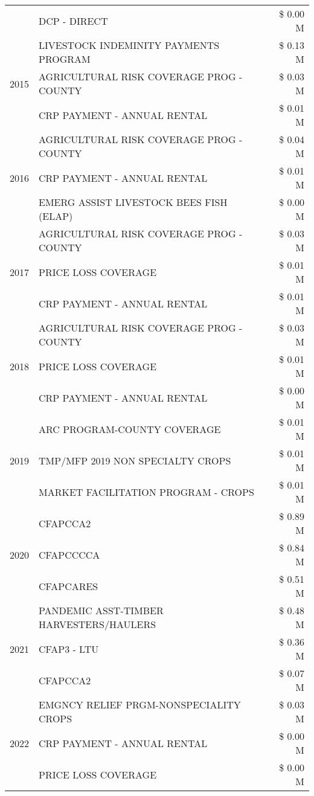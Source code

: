 \begin{tabular}{llr}
 & DCP - DIRECT & \$ 0.00 M \\
\cline{1-3}
\multirow[t]{3}{*}{2015} & LIVESTOCK INDEMINITY PAYMENTS PROGRAM & \$ 0.13 M \\
 & AGRICULTURAL RISK COVERAGE PROG - COUNTY & \$ 0.03 M \\
 & CRP PAYMENT - ANNUAL RENTAL & \$ 0.01 M \\
\cline{1-3}
\multirow[t]{3}{*}{2016} & AGRICULTURAL RISK COVERAGE PROG - COUNTY & \$ 0.04 M \\
 & CRP PAYMENT - ANNUAL RENTAL & \$ 0.01 M \\
 & EMERG ASSIST LIVESTOCK BEES FISH (ELAP) & \$ 0.00 M \\
\cline{1-3}
\multirow[t]{3}{*}{2017} & AGRICULTURAL RISK COVERAGE PROG - COUNTY & \$ 0.03 M \\
 & PRICE LOSS COVERAGE & \$ 0.01 M \\
 & CRP PAYMENT - ANNUAL RENTAL & \$ 0.01 M \\
\cline{1-3}
\multirow[t]{3}{*}{2018} & AGRICULTURAL RISK COVERAGE PROG - COUNTY & \$ 0.03 M \\
 & PRICE LOSS COVERAGE & \$ 0.01 M \\
 & CRP PAYMENT - ANNUAL RENTAL & \$ 0.00 M \\
\cline{1-3}
\multirow[t]{3}{*}{2019} & ARC PROGRAM-COUNTY COVERAGE & \$ 0.01 M \\
 & TMP/MFP 2019 NON SPECIALTY CROPS & \$ 0.01 M \\
 & MARKET FACILITATION PROGRAM - CROPS & \$ 0.01 M \\
\cline{1-3}
\multirow[t]{3}{*}{2020} & CFAPCCA2 & \$ 0.89 M \\
 & CFAPCCCCA & \$ 0.84 M \\
 & CFAPCARES & \$ 0.51 M \\
\cline{1-3}
\multirow[t]{3}{*}{2021} & PANDEMIC ASST-TIMBER HARVESTERS/HAULERS & \$ 0.48 M \\
 & CFAP3 - LTU & \$ 0.36 M \\
 & CFAPCCA2 & \$ 0.07 M \\
\cline{1-3}
\multirow[t]{3}{*}{2022} & EMGNCY RELIEF PRGM-NONSPECIALITY CROPS & \$ 0.03 M \\
 & CRP PAYMENT - ANNUAL RENTAL & \$ 0.00 M \\
 & PRICE LOSS COVERAGE & \$ 0.00 M \\
\cline{1-3}
\bottomrule
\end{tabular}
